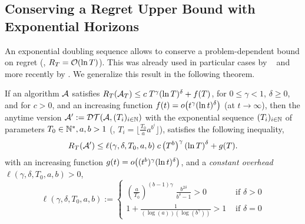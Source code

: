 \documentclass[12pt]{colt2018} %
\begin{document}
\subsection{Conserving a Regret Upper Bound with Exponential Horizons}

An exponential doubling sequence allows to conserve a problem-dependent bound on regret (\ie, $R_T = \mathop{}\mathopen{}\mathcal{O}\mathopen{}\left(\ln T\right)$). This was already used in particular cases by ~\cite{Auer10} and more recently by \cite{Liauetal2017}.
We generalize this result in the following theorem.




\begin{theorem}\label{thm:keep52}
    If an algorithm $\mathcal{A}$ satisfies
    $ R_T(\mathcal{A}_T) \leq c \; T^{\gamma} (\ln T)^{\delta}+ f(T)$,
    for $0\leq\gamma<1$, $\delta \geq 0$,
    and for $c > 0$, and an increasing function $f(t) = \mathop{}\mathopen{}o\mathopen{}\left(t^{\gamma} (\ln t)^{\delta}\right)$ (at $t\to\infty$),
    then the anytime version $\mathcal{A}':=\mathcal{DT}(\mathcal{A}, (T_i)_{i\in\mathbb{N}})$ with the exponential sequence $(T_i)_{i\in\mathbb{N}}$ of parameters $T_0\in\mathbb{N}^*,a,b>1$ (\ie, $T_i = \lfloor \frac{T_0}{a} a^{b^i}\rfloor$),
    satisfies the following inequality,
    \begin{equation}\label{eq:keep52_1}
        R_T(\mathcal{A}') \leq \ell(\gamma, \delta, T_0, a, b) \; c \left(T^b\right)^{\gamma} \left(\ln T\right)^{\delta} + g(T).
    \end{equation}
    with an increasing function $g(t) = \mathop{}\mathopen{}o\mathopen{}\left((t^b)^{\gamma} (\ln t)^{\delta}\right)$,
    and a \emph{constant overhead} $\ell(\gamma, \delta, T_0, a, b) > 0$,
    \begin{equation}\label{eq:keep52_2}
        \ell(\gamma, \delta, T_0, a, b) :=
        \begin{cases}
            \left(\frac{a}{T_0}\right)^{(b-1)\gamma} \; \frac{b^{2\delta}}{b^{\delta} - 1} > 0
            & \text{ if } \delta > 0 \\
            1 + \frac{1}{(\log(a)) (\log(b^{\gamma}))} > 1
            & \text{ if } \delta = 0
        \end{cases}
    \end{equation}
\end{theorem}
\end{document}
